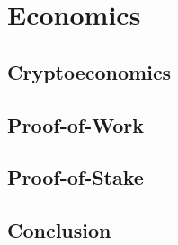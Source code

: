 \chapter{Economics}

\section{Cryptoeconomics}

\section{Proof-of-Work}

\section{Proof-of-Stake}

\section{Conclusion}
